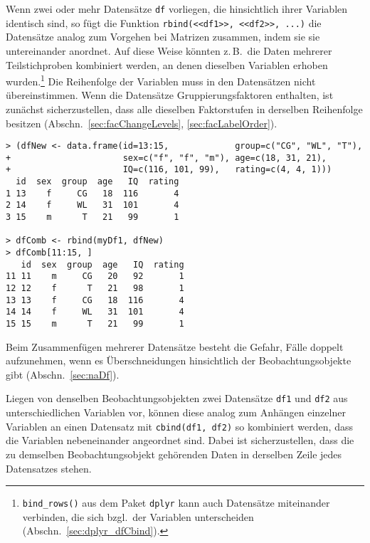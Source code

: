 Wenn zwei oder mehr Datensätze \lstinline!df! vorliegen, die hinsichtlich ihrer Variablen identisch sind, so fügt die Funktion \lstinline!rbind(<<df1>>, <<df2>>, ...)! die Datensätze analog zum Vorgehen bei Matrizen zusammen, indem sie sie untereinander anordnet. Auf diese Weise könnten z.\,B.\ die Daten mehrerer Teilstichproben kombiniert werden, an denen dieselben Variablen erhoben wurden.\footnote{\lstinline!bind_rows()! aus dem Paket \lstinline!dplyr! kann auch Datensätze miteinander verbinden, die sich bzgl.\ der Variablen unterscheiden (Abschn.\ \ref{sec:dplyr_dfCbind}).} Die Reihenfolge der Variablen muss in den Datensätzen nicht übereinstimmen. Wenn die Datensätze Gruppierungsfaktoren enthalten, ist zunächst sicherzustellen, dass alle dieselben Faktorstufen in derselben Reihenfolge besitzen (Abschn.\ \ref{sec:facChangeLevels}, \ref{sec:facLabelOrder}).
\begin{lstlisting}
> (dfNew <- data.frame(id=13:15,             group=c("CG", "WL", "T"),
+                      sex=c("f", "f", "m"), age=c(18, 31, 21),
+                      IQ=c(116, 101, 99),   rating=c(4, 4, 1)))
  id  sex  group  age   IQ  rating
1 13    f     CG   18  116       4
2 14    f     WL   31  101       4
3 15    m      T   21   99       1

> dfComb <- rbind(myDf1, dfNew)
> dfComb[11:15, ]
   id  sex  group  age   IQ  rating
11 11    m     CG   20   92       1
12 12    f      T   21   98       1
13 13    f     CG   18  116       4
14 14    f     WL   31  101       4
15 15    m      T   21   99       1
\end{lstlisting}

Beim Zusammenfügen mehrerer Datensätze besteht die Gefahr, Fälle doppelt aufzunehmen, wenn es Überschneidungen hinsichtlich der Beobachtungsobjekte gibt (Abschn.\ \ref{sec:naDf}).

Liegen von denselben Beobachtungsobjekten zwei Datensätze \lstinline!df1! und \lstinline!df2! aus unterschiedlichen Variablen vor, können diese analog zum Anhängen einzelner Variablen an einen Datensatz mit \lstinline!cbind(df1, df2)! so kombiniert werden, dass die Variablen nebeneinander angeordnet sind. Dabei ist sicherzustellen, dass die zu demselben Beobachtungsobjekt gehörenden Daten in derselben Zeile jedes Datensatzes stehen.

